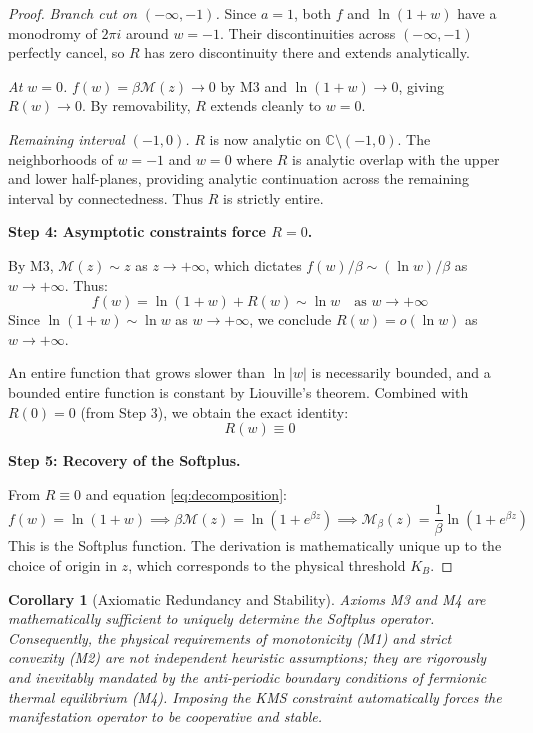 \documentclass[12pt]{article}
\newcommand{\C}{\mathbb{C}}
\newcommand{\Man}{\mathcal{M}}
\newtheorem{corollary}[theorem]{Corollary}
\theoremstyle{definition}
\theoremstyle{remark}
\begin{document}
\begin{proof}
\emph{Branch cut on $(-\infty, -1)$.} Since $a = 1$, both $f$ and $\ln(1+w)$ have a monodromy of $2\pi i$ around $w = -1$. Their discontinuities across $(-\infty, -1)$ perfectly cancel, so $R$ has zero discontinuity there and extends analytically.

\emph{At $w = 0$.} $f(w) = \beta\Man(z) \to 0$ by M3 and $\ln(1+w) \to 0$, giving $R(w) \to 0$. By removability, $R$ extends cleanly to $w = 0$.

\emph{Remaining interval $(-1, 0)$.} $R$ is now analytic on $\C \setminus (-1, 0)$. The neighborhoods of $w = -1$ and $w = 0$ where $R$ is analytic overlap with the upper and lower half-planes, providing analytic continuation across the remaining interval by connectedness. Thus $R$ is strictly entire.

\vspace{6pt}
\noindent\textbf{Step 4: Asymptotic constraints force $R = 0$.}

By M3, $\Man(z) \sim z$ as $z \to +\infty$, which dictates $f(w)/\beta \sim (\ln w)/\beta$ as $w \to +\infty$. Thus:
\begin{equation}
    f(w) = \ln(1+w) + R(w) \sim \ln w \quad \text{as } w \to +\infty
\end{equation}
Since $\ln(1+w) \sim \ln w$ as $w \to +\infty$, we conclude $R(w) = o(\ln w)$ as $w \to +\infty$.

An entire function that grows slower than $\ln|w|$ is necessarily bounded, and a bounded entire function is constant by Liouville's theorem. Combined with $R(0) = 0$ (from Step 3), we obtain the exact identity:
\begin{equation}
    R(w) \equiv 0
\end{equation}

\vspace{6pt}
\noindent\textbf{Step 5: Recovery of the Softplus.}

From $R \equiv 0$ and equation \eqref{eq:decomposition}:
\begin{equation}
    f(w) = \ln(1+w) \implies \beta\Man(z) = \ln(1 + e^{\beta z}) \implies \Man_\beta(z) = \frac{1}{\beta}\ln(1 + e^{\beta z})
\end{equation}
This is the Softplus function. The derivation is mathematically unique up to the choice of origin in $z$, which corresponds to the physical threshold $K_B$.
\end{proof}

\begin{corollary}[Axiomatic Redundancy and Stability]
\label{cor:analytic_rigidity}
Axioms M3 and M4 are mathematically sufficient to uniquely determine the Softplus operator. Consequently, the physical requirements of monotonicity (M1) and strict convexity (M2) are not independent heuristic assumptions; they are rigorously and inevitably mandated by the anti-periodic boundary conditions of fermionic thermal equilibrium (M4). Imposing the KMS constraint automatically forces the manifestation operator to be cooperative and stable.
\end{corollary}
\end{document}
